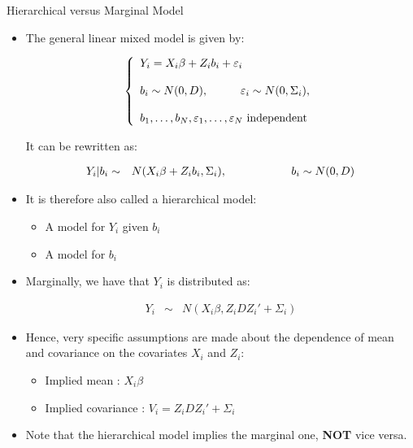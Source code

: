 \documentclass{beamer}
\begin{document}
\begin{frame}{Hierarchical versus Marginal Model }
\begin{itemize}
\item The general linear mixed model is given by:

\begin{eqnarray*}
\left\{ \begin{array}{l}
Y_{i} = X_{i} \beta + Z_{i} b_{i} + \varepsilon_{i} \\   \\
b_{i} \sim N(0, D),  \hspace*{1cm} \varepsilon_{i} \sim N(0, \Sigma_{i}),  \\   \\
b_{1}, \ldots, b_{N}, \varepsilon_{1}, \ldots, \varepsilon_{N}  \mbox{ independent}
\end{array} \right.
\end{eqnarray*}

It can be rewritten as:

\begin{eqnarray*}
Y_{i} | b_{i} & \sim  & N(X_{i} \beta + Z_{i} b_{i}, \Sigma_{i}), \hspace*{2cm}
b_{i} \sim   N(0, D)
\end{eqnarray*}
\end{itemize}
\end{frame}

\begin{frame}
\begin{itemize}
\item It is therefore also called a hierarchical model:
\begin{itemize}
\item A model for $Y_{i}$ given $ b_{i} $
\item A model for $ b_{i}$
\end{itemize}

\item Marginally, we have that $Y_{i} $ is distributed as:

\begin{eqnarray*}
Y_{i} & \sim & N(X_{i} \beta, Z_{i} D Z_{i}' + \Sigma_{i})
\end{eqnarray*}

\item Hence, very specific assumptions are made about the dependence of mean and covariance on the covariates $X_{i}$ and $Z_{i}$:

\begin{itemize}
\item Implied mean : $X_{i} \beta $
\item Implied covariance : $V_{i} = Z_{i} D Z_{i}' + \Sigma_{i} $
\end{itemize}
\item Note that the hierarchical model implies the marginal one, \textbf{ NOT} vice versa.
\end{itemize}
\end{frame}
\end{document}
